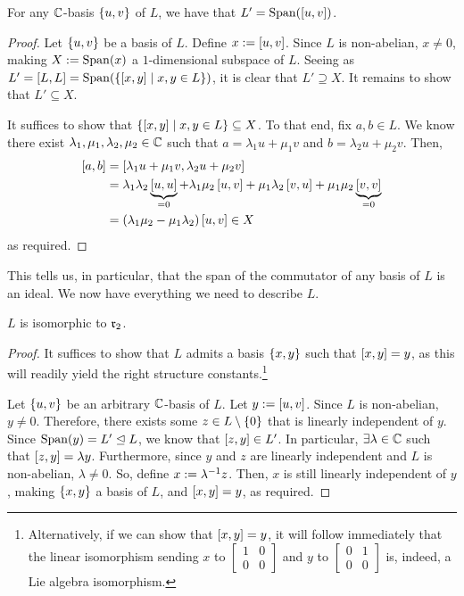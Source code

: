 \begin{boxlemma}
    For any $\mathbb{C}$-basis $\left\{ u, v \right\}$ of $L$, we have that $L' = \operatorname{Span}\!\left( \left[ u, v \right] \right)$.
\end{boxlemma}
\begin{proof}
    Let $\left\{ u, v \right\}$ be a basis of $L$. Define $x := \left[ u, v \right]$. Since $L$ is non-abelian, $x \neq 0$, making $X := \operatorname{Span}\!\left( x \right)$ a $1$-dimensional subspace of $L$. Seeing as $L' = \left[ L, L \right] = \operatorname{Span}\!\left( \left\{ \left[ x, y \right] \; \middle\vert \; x, y \in L \right\} \right)$, it is clear that $L' \supseteq X$. It remains to show that $L' \subseteq X$.

    It suffices to show that $\left\{ \left[ x, y \right] \; \middle\vert \; x, y \in L \right\} \subseteq X$. To that end, fix $a, b \in L$. We know there exist $\lambda_1, \mu_1, \lambda_2, \mu_2 \in \mathbb{C}$ such that $a = \lambda_1 u + \mu_1 v$ and $b = \lambda_2 u + \mu_2 v$. Then,
    \begin{align*}
        \left[ a, b \right]
        &= \left[ \lambda_1 u + \mu_1 v, \lambda_2 u + \mu_2 v \right] \\
        &= \lambda_1 \lambda_2 \underbrace{\left[ u, u \right]}_{= 0} + \lambda_1 \mu_2 \left[ u, v \right] + \mu_1 \lambda_2 \left[ v, u \right] + \mu_1 \mu_2 \underbrace{\left[ v, v \right]}_{= 0} \\
        &= \left( \lambda_1 \mu_2 - \mu_1 \lambda_2 \right) \left[ u, v \right] \in X
    \end{align*}
    as required.
\end{proof}

This tells us, in particular, that the span of the commutator of any basis of $L$ is an ideal. We now have everything we need to describe $L$.

\begin{boxproposition}
    $L$ is isomorphic to $\mathfrak{r}_2$.
\end{boxproposition}
\begin{proof}
    It suffices to show that $L$ admits a basis $\left\{ x, y \right\}$ such that $\left[ x, y \right] = y$, as this will readily yield the right structure constants.\footnote{Alternatively, if we can show that $\left[ x, y \right] = y$, it will follow immediately that the linear isomorphism sending $x$ to $\begin{bmatrix} 1 & 0 \\ 0 & 0 \end{bmatrix}$ and $y$ to $\begin{bmatrix} 0 & 1 \\ 0 & 0 \end{bmatrix}$ is, indeed, a Lie algebra isomorphism.}
    
    Let $\left\{ u, v \right\}$ be an arbitrary $\mathbb{C}$-basis of $L$. Let $y := \left[ u, v \right]$. Since $L$ is non-abelian, $y \neq 0$. Therefore, there exists some $z \in L \setminus \left\{ 0 \right\}$ that is linearly independent of $y$. Since $\operatorname{Span}\!\left( y \right) = L' \trianglelefteq L$, we know that $\left[ z, y \right] \in L'$. In particular, $\exists \lambda \in \mathbb{C}$ such that $\left[ z, y \right] = \lambda y$. Furthermore, since $y$ and $z$ are linearly independent and $L$ is non-abelian, $\lambda \neq 0$. So, define $x := \lambda^{-1} z$. Then, $x$ is still linearly independent of $y$, making $\left\{ x, y \right\}$ a basis of $L$, and $\left[ x, y \right] = y$, as required.
\end{proof}

